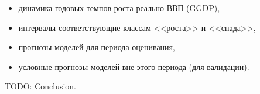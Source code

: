 \documentclass[a4paper,14pt]{extreport}
\begin{document}
\begin{itemize}
	\item динамика годовых темпов роста реально ВВП (GGDP),
	\item интервалы соответствующие классам <<роста>> и <<спада>>,
	\item прогнозы моделей для периода оценивания,
	\item условные прогнозы моделей вне этого периода (для валидации).
\end{itemize}




TODO: Conclusion.


\printbibliography[title=Список использованных источников]



\end{document}
